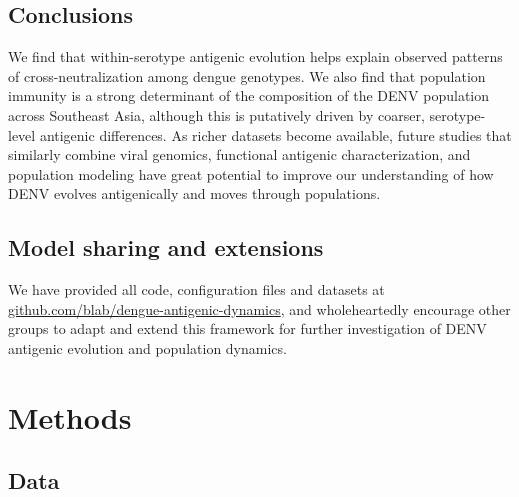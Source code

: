 \documentclass[11pt,oneside,letterpaper]{article}
\begin{document}
\subsection*{Conclusions}
We find that within-serotype antigenic evolution helps explain observed patterns of cross-neutralization among dengue genotypes.
We also find that population immunity is a strong determinant of the composition of the DENV population across Southeast Asia, although this is putatively driven by coarser, serotype-level antigenic differences.
As richer datasets become available, future studies that similarly combine viral genomics, functional antigenic characterization, and population modeling have great potential to improve our understanding of how DENV evolves antigenically and moves through populations.

\subsection*{Model sharing and extensions}
We have provided all code, configuration files and datasets at \href{https://github.com/blab/dengue-antigenic-dynamics}{github.com/blab/dengue-antigenic-dynamics}, and wholeheartedly encourage other groups to adapt and extend this framework for further investigation of DENV antigenic evolution and population dynamics.

\newpage

\section*{Methods}
\subsection*{Data}
\end{document}
